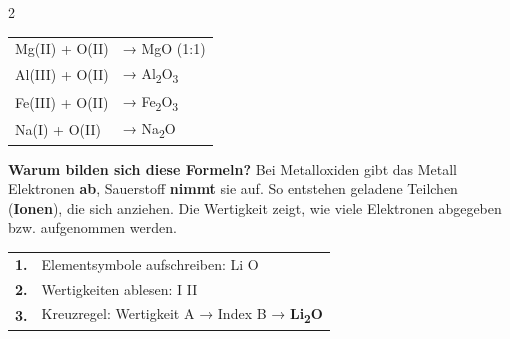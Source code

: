 \documentclass[9pt, a4paper]{article}
\begin{document}
\begin{multicols}{2}
\vspace{4pt}
\small
\begin{tabular}{@{}ll@{}}
Mg(II) + O(II) & → MgO (1:1) \\
Al(III) + O(II) & → Al\textsubscript{2}O\textsubscript{3} \\
Fe(III) + O(II) & → Fe\textsubscript{2}O\textsubscript{3} \\
Na(I) + O(II) & → Na\textsubscript{2}O \\
\end{tabular}

\end{multicols}

\vspace{-4pt}

\begin{hinweiskasten}
\small
\textbf{Warum bilden sich diese Formeln?} Bei Metalloxiden gibt das Metall Elektronen \textbf{ab}, Sauerstoff \textbf{nimmt} sie auf. So entstehen geladene Teilchen (\textbf{Ionen}), die sich anziehen. Die Wertigkeit zeigt, wie viele Elektronen abgegeben bzw. aufgenommen werden.
\end{hinweiskasten}

\vspace{-2pt}


\begin{algorithmusbox}
\small
\begin{tabular}{@{}cl}
\textbf{1.} & Elementsymbole aufschreiben: \hfill Li \quad O \\
\textbf{2.} & Wertigkeiten ablesen: \hfill I \quad II \\
\textbf{3.} & Kreuzregel: Wertigkeit A → Index B \hfill → \textbf{Li\textsubscript{2}O} \\
\end{tabular}
\end{algorithmusbox}

\vspace{-4pt}
\end{document}
